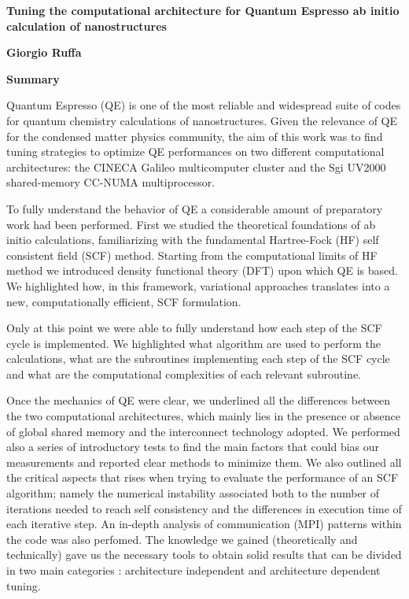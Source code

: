 \documentclass[a4paper,10pt]{article}
\begin{document}
\thispagestyle{plain}
\begin{center}
	\vspace*{-4cm}
    \Large
    \textbf{ Tuning the computational architecture for Quantum Espresso ab initio calculation of nanostructures }
    
    \vspace{0.4cm}
    \textbf{Giorgio Ruffa}
    
    \vspace{0.5cm}
    \textbf{Summary}
\end{center}

Quantum Espresso (QE) is one of the most reliable and widespread  suite of codes for quantum chemistry calculations of nanostructures\cite{QE}. 
Given the relevance of QE for the condensed matter physics community, the aim of this work was to find tuning strategies to optimize QE performances on two different computational architectures: 
the CINECA Galileo multicomputer cluster and the Sgi UV2000 shared-memory CC-NUMA multiprocessor.

To fully understand the behavior of QE a considerable amount of preparatory work had been performed.
First we studied the theoretical foundations of ab initio calculations, familiarizing with the fundamental Hartree-Fock (HF) self consistent field (SCF) method\cite{Attila}.
Starting from the computational limits of HF method we introduced density functional theory (DFT)\cite{Parr} upon which QE is based.
We highlighted how, in this framework, variational approaches translates into a new, computationally efficient, SCF formulation\cite{Martin}.

Only at this point we were able to fully understand how each step of the SCF cycle is implemented\cite{Marx}.
We highlighted what algorithm are used to perform the calculations, what are the subroutines implementing each step of the SCF cycle and what are the computational complexities of each relevant subroutine.


Once the mechanics of QE were clear, we underlined all the differences between the two computational architectures, which mainly lies in the presence or absence of global shared memory and the interconnect technology adopted\cite{Tanenbaum}.
We performed also a series of introductory tests to find the main factors that could bias our measurements and reported clear methods to minimize them. 
We also outlined all the critical aspects that rises when trying to evaluate the performance of an SCF algorithm; namely the numerical instability associated both to the number of iterations needed to reach self consistency and the differences in execution time of each iterative step.
An in-depth analysis of communication (MPI) patterns within the code was also perfomed.
The knowledge we gained (theoretically and technically) gave us the necessary tools to obtain solid results that can be divided in two main categories : architecture independent and architecture dependent tuning.
\end{document}
